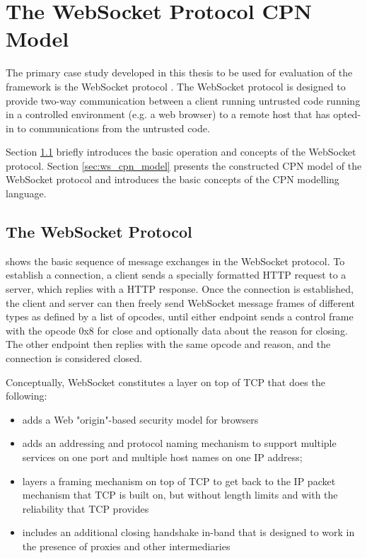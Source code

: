 \chapter{The WebSocket Protocol CPN Model}
\label{chap:background}

The primary case study developed in this thesis to be used for evaluation of the
\thename{} framework is the WebSocket protocol \cite{draft-ietf-hybi-thewebsocketprotocol}.
The WebSocket protocol is designed to provide two-way communication between a
client running untrusted code running in a controlled environment (e.g. a web
browser) to a remote host that has opted-in to communications from the untrusted code.

Section \ref{sec:ws} briefly introduces the basic operation and concepts of the
WebSocket protocol. Section \ref{sec:ws_cpn_model} presents the constructed CPN
model of the WebSocket protocol and introduces the basic concepts of the CPN
modelling language.

\section{The WebSocket Protocol}\label{sec:ws}

 shows the basic sequence of message exchanges in the
WebSocket protocol.
To establish a connection, a client sends a specially formatted HTTP request to
a server, which replies with a HTTP response. Once the connection is
established, the client and server can then freely send WebSocket message frames
of different types as defined by a list of opcodes, until either endpoint sends
a control frame with the opcode 0x8 for close and optionally data about the
reason for closing. The other endpoint then replies with the same opcode and
reason, and the connection is considered closed.

Conceptually, WebSocket constitutes a layer on top of TCP that
does the following:
\begin{itemize}
	\item adds a Web "origin"-based security model for browsers

	\item adds an addressing and protocol naming mechanism to support
	multiple services on one port and multiple host names on one IP
	address;

	\item layers a framing mechanism on top of TCP to get back to the IP
	packet mechanism that TCP is built on, but without length limits and with
	the reliability that TCP provides

	\item includes an additional closing handshake in-band that is designed
	to work in the presence of proxies and other intermediaries
\end{itemize}


